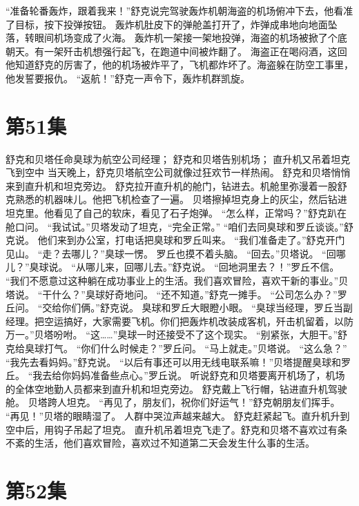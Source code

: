 \documentclass[a4paper,12pt,UTF8,twoside]{ctexbook}
\begin{document}
        “准备轮番轰炸，跟着我来！”舒克说完驾驶轰炸机朝海盗的机场俯冲下去，他看准了目标，按下投弹按钮。 
        轰炸机肚皮下的弹舱盖打开了，炸弹成串地向地面坠落，转眼间机场变成了火海。 
        轰炸机一架接一架地投弹，海盗的机场被掀了个底朝天。有一架歼击机想强行起飞，在跑道中间被炸翻了。 
        海盗正在喝闷酒，这回他知道舒克的厉害了，他的机场被炸平了，飞机都炸坏了。海盗躲在防空工事里，他发誓要报仇。 
        “返航！”舒克一声令下，轰炸机群凯旋。   \chapter{第51集} 
        舒克和贝塔任命臭球为航空公司经理； 
        舒克和贝塔告别机场； 
        直升机又吊着坦克飞到空中   
        当天晚上，舒克贝塔航空公司就像过狂欢节一样热闹。 
        舒克和贝塔悄悄来到直升机和坦克旁边。 
        舒克拉开直升机的舱门，钻进去。机舱里弥漫着一股舒克熟悉的机器味儿。他把飞机检查了一遍。 
        贝塔擦掉坦克身上的灰尘，然后钻进坦克里。他看见了自己的软床，看见了石子炮弹。 
        “怎么样，正常吗？”舒克趴在舱口问。 
        “我试试。”贝塔发动了坦克，“完全正常。” 
        “咱们去同臭球和罗丘谈谈。”舒克说。 
        他们来到办公室，打电话把臭球和罗丘叫来。 
        “我们准备走了。”舒克开门见山。 
        “走？去哪儿？”臭球一愣。 
        罗丘也摸不着头脑。 
        “回去。”贝塔说。 
        “回哪儿？”臭球说。 
        “从哪儿来，回哪儿去。”舒克说。 
        “回地洞里去？！”罗丘不信。 
        “我们不愿意过这种躺在成功事业上的生活。我们喜欢冒险，喜欢干新的事业。”贝塔说。 
        “干什么？”臭球好奇地问。 
        “还不知道。”舒克一摊手。 
        “公司怎么办？”罗丘问。 
        “交给你们俩。”舒克说。 
        臭球和罗丘大眼瞪小眼。 
        “臭球当经理，罗丘当副经理。把空运搞好，大家需要飞机。你们把轰炸机改装成客机，歼击机留着，以防万一。”贝塔吩咐。 
        “这……”臭球一时还接受不了这个现实。 
        “别紧张，大胆干。”舒克给臭球打气。 
        “你们什么时候走？”罗丘问。 
        “马上就走。”贝塔说。 
        “这么急？” 
        “我先去看妈妈。”舒克说。 
        “以后有事还可以用无线电联系嘛！”贝塔提醒臭球和罗丘。 
        “我去给你妈妈准备些点心。”罗丘说。 
        听说舒克和贝塔要离开机场了，机场的全体空地勤人员都来到直升机和坦克旁边。 
        舒克戴上飞行帽，钻进直升机驾驶舱。 
        贝塔跨人坦克。 
        “再见了，朋友们，祝你们好运气！”舒克朝朋友们挥手。 
        “再见！”贝塔的眼睛湿了。 
        人群中哭泣声越来越大。 
        舒克赶紧起飞。直升机升到空中后，用钩子吊起了坦克。 
        直升机吊着坦克飞走了。舒克和贝塔不喜欢过有条不紊的生活，他们喜欢冒险，喜欢过不知道第二天会发生什么事的生活。   \chapter{第52集} 
\end{document}
